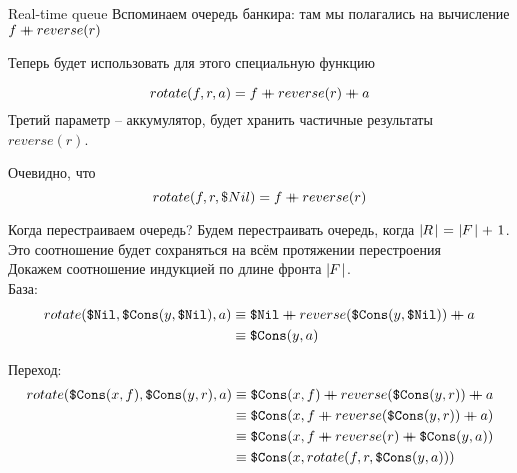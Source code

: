 \begin{frame}{Real-time queue}
Вспоминаем очередь банкира: там мы полагались на вычисление
$f \mathbin{+\mkern-10mu+} reverse (r)$

Теперь будет использовать для этого специальную функцию 

\[
rotate (f, r, a) =  f \mathbin{+\mkern-10mu+} reverse(r) \mathbin{+\mkern-10mu+} a
\]
Третий параметр -- аккумулятор, будет хранить частичные результаты $reverse(r)$.
\vspace{1em}

Очевидно, что
\[
  rotate (f, r, \$Nil) =  f \mathbin{+\mkern-10mu+} reverse(r)
\]
\end{frame}

\begin{frame}{Когда перестраиваем очередь?}
Будем перестраивать очередь, когда $\card{R}\ =\ \card{F} +\ 1$. Это соотношение будет сохраняться на всём протяжении перестроения\\

Докажем соотношение индукцией по длине фронта $\mid\!\!F\!\mid$.\\

База:
\begin{equation*}
\begin{split}
rotate (\texttt{\$Nil}, \texttt{\$Cons}(y,\texttt{\$Nil}), a)
& \equiv \texttt{\$Nil}\mathbin{+\mkern-10mu+} reverse(\texttt{\$Cons}(y,\texttt{\$Nil})) \mathbin{+\mkern-10mu+} a \\
& \equiv \texttt{\$Cons}(y,a)
\end{split}
\end{equation*}

Переход:
\begin{equation*}
\begin{split}
rotate (\cons{x}{f}, \cons{y}{r}, a)
& \equiv \cons{x}{f} \concat  reverse(\cons{y}{r}) \concat a \\
& \equiv \cons{x}{f \concat  reverse(\cons{y}{r}) \concat a} \\
& \equiv \cons{x}{f \concat  reverse(r) \concat \cons{y}{a}} \\
& \equiv \cons{x}{rotate (f, r, \cons{y}{a})}
\end{split}
\end{equation*}
\end{frame}


